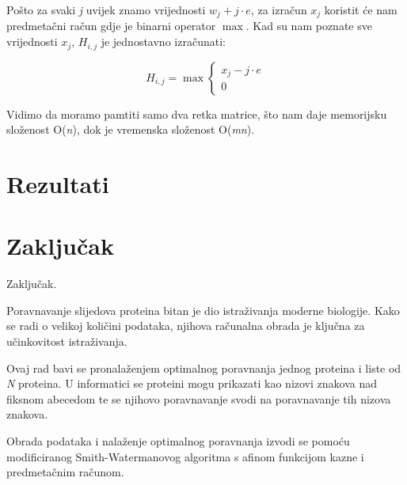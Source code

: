 \documentclass[times, utf8, zavrsni, numeric]{fer}
\begin{document}
Pošto za svaki \emph{j} uvijek znamo vrijednosti $w_{j} + j\cdot e$, za izračun $x_{j}$ koristit će nam predmetačni račun gdje je binarni operator $\max$. Kad su nam poznate sve vrijednosti $x_{j}$, $H_{i, j}$ je jednostavno izračunati:
\begin{center}
\begin{displaymath}
H_{i, j} = \max \left \{
	\begin{array}{lr}
	x_{j} - j \cdot e\\
	0
	\end{array}
\right.
\end{displaymath}
\end{center}

Vidimo da moramo pamtiti samo dva retka matrice, što nam daje memorijsku složenost O(\emph{n}), dok je vremenska složenost O(\emph{mn}).

\chapter{Rezultati}


\chapter{Zaključak}
Zaključak.




\begin{sazetak}
\indent

Poravnavanje slijedova proteina bitan je dio istraživanja moderne biologije. Kako se radi o velikoj količini podataka, njihova računalna obrada je ključna za učinkovitost istraživanja.

Ovaj rad bavi se pronalaženjem optimalnog poravnanja jednog proteina i liste od \textit{N} proteina. U informatici se proteini mogu prikazati kao nizovi znakova nad fiksnom abecedom te se njihovo poravnavanje svodi na poravnavanje tih nizova znakova.

Obrada podataka i nalaženje optimalnog poravnanja izvodi se pomoću modificiranog Smith-Watermanovog algoritma s afinom funkcijom kazne i predmetačnim računom.


\end{sazetak}
\end{document}
